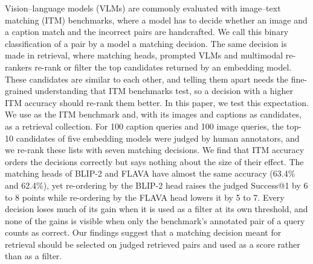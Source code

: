 Vision--language models (VLMs) are commonly evaluated with image--text matching (ITM) benchmarks, where a model has to decide whether an image and a caption match and the incorrect pairs are handcrafted. We call this binary classification of a pair by a model a matching decision. The same decision is made in retrieval, where matching heads, prompted VLMs and multimodal re-rankers re-rank or filter the top candidates returned by an embedding model. These candidates are similar to each other, and telling them apart needs the fine-grained understanding that ITM benchmarks test, so a decision with a higher ITM accuracy should re-rank them better. In this paper, we test this expectation. We use \svo{} as the ITM benchmark and, with its images and captions as candidates, as a retrieval collection. For 100 caption queries and 100 image queries, the top-10 candidates of five embedding models were judged by human annotators, and we re-rank these lists with seven matching decisions. We find that ITM accuracy orders the decisions correctly but says nothing about the size of their effect. The matching heads of BLIP-2 and FLAVA have almost the same accuracy (63.4\% and 62.4\%), yet re-ordering by the BLIP-2 head raises the judged Success@1 by 6 to 8 points while re-ordering by the FLAVA head lowers it by 5 to 7. Every decision loses much of its gain when it is used as a filter at its own threshold, and none of the gains is visible when only the benchmark's annotated pair of a query counts as correct. Our findings suggest that a matching decision meant for retrieval should be selected on judged retrieved pairs and used as a score rather than as a filter.

